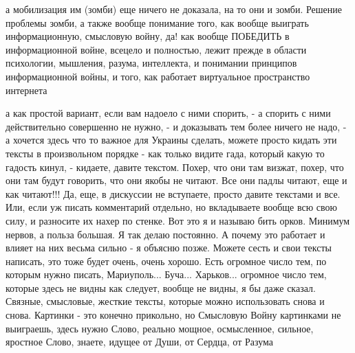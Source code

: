  
 
 
 
 

а мобилизация им (зомби) еще ничего не доказала, на то они и зомби. Решение
проблемы зомби, а также вообще понимание того, как вообще выиграть
информационную, смысловую войну, да! как вообще ПОБЕДИТЬ в информационной
войне, всецело и полностью, лежит прежде в области психологии, мышления,
разума, интеллекта, и понимании принципов информационной войны, и того, как
работает виртуальное пространство интернета

а как простой вариант, если вам надоело с ними спорить, - а спорить с ними
действительно совершенно не нужно, - и доказывать тем более ничего не надо, - а
хочется здесь что то важное для Украины сделать, можете просто кидать эти
тексты в произвольном порядке - как только видите гада, который какую то
гадость кинул, - кидаете, давите текстом. Похер, что они там визжат, похер, что
они там будут говорить, что они якобы не читают. Все они падлы читают, еще и
как читают!!! Да, еще, в дискуссии не вступаете, просто давите текстами и все.
Или, если уж писать комментарий отдельно, но вкладываете вообще всю свою силу,
и разносите их нахер по стенке. Вот это я и называю бить орков. Минимум нервов,
а польза большая. Я так делаю постоянно. А почему это работает и влияет на них
весьма сильно - я объясню позже. Можете сесть и свои тексты написать, это тоже
будет очень, очень хорошо. Есть огромное число тем, по которым нужно писать,
Мариуполь... Буча... Харьков... огромное число тем, которые здесь не видны как
следует, вообще не видны, я бы даже сказал. Связные, смысловые, жесткие тексты,
которые можно использовать снова и снова. Картинки - это конечно прикольно, но
Смысловую Войну картинками не выиграешь, здесь нужно Слово, реально мощное,
осмысленное, сильное, яростное Слово, знаете, идущее от Души, от Сердца, от
Разума
